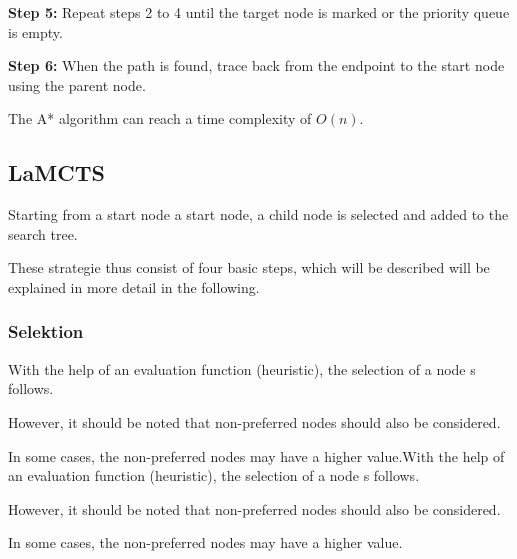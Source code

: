 \documentclass[bibliography=totoc]{scrartcl}
\begin{document}
\textbf{Step 5:} Repeat steps 2 to 4 until the target node is marked or the priority queue is empty.







\textbf{Step 6:} When the path is found, trace back from the endpoint to the start node using the parent node.







The A* algorithm can reach a time complexity of $O(n)$.











\subsection{LaMCTS}



Starting from a start node a start node, a child node is selected and added to the search tree.



These strategie thus consist of four basic steps, which will be described will be explained in more detail in the following.



\subsubsection{Selektion}



With the help of an evaluation function (heuristic), the selection of a node s follows. 



However, it should be noted that non-preferred nodes should also be considered.



In some cases, the non-preferred nodes may have a higher value.With the help of an evaluation function (heuristic), the selection of a node s follows. 



However, it should be noted that non-preferred nodes should also be considered.



In some cases, the non-preferred nodes may have a higher value.
\end{document}
